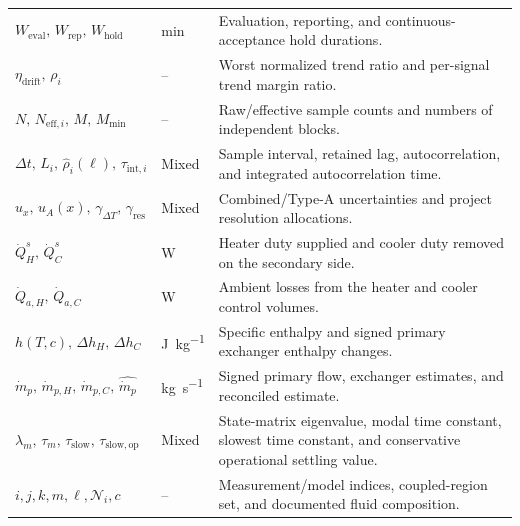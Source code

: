 \documentclass[11pt]{article}
\newcommand{\QHs}{\dot Q_{H}^{s}}
\newcommand{\QCs}{\dot Q_{C}^{s}}
\newcommand{\mdotp}{\dot m_{p}}
\newcommand{\mdotpH}{\dot m_{p,H}}
\newcommand{\mdotpC}{\dot m_{p,C}}
\begin{document}
\begin{longtable}{@{}>{\raggedright\arraybackslash}p{1.78in}>{\raggedright\arraybackslash}p{1.08in}>{\raggedright\arraybackslash}p{3.62in}@{}}
$W_{\mathrm{eval}},\,W_{\mathrm{rep}},\,W_{\mathrm{hold}}$ & \si{\minute} & Evaluation, reporting, and continuous-acceptance hold durations. \\
$\eta_{\mathrm{drift}},\,\rho_i$ & -- & Worst normalized trend ratio and per-signal trend margin ratio. \\
$N,\,N_{\mathrm{eff},i},\,M,\,M_{\min}$ & -- & Raw/effective sample counts and numbers of independent blocks. \\
$\Delta t,\,L_i,\,\widehat\rho_i(\ell),\,\tau_{\mathrm{int},i}$ & Mixed & Sample interval, retained lag, autocorrelation, and integrated autocorrelation time. \\
$u_x,\,u_A(x),\,\gamma_{\Delta T},\,\gamma_{\mathrm{res}}$ & Mixed & Combined/Type-A uncertainties and project resolution allocations. \\
$\QHs,\,\QCs$ & \si{\watt} & Heater duty supplied and cooler duty removed on the secondary side. \\
$\dot Q_{a,H},\,\dot Q_{a,C}$ & \si{\watt} & Ambient losses from the heater and cooler control volumes. \\
$h(T,c),\,\Delta h_H,\,\Delta h_C$ & \si{\joule\per\kilogram} & Specific enthalpy and signed primary exchanger enthalpy changes. \\
$\mdotp,\,\mdotpH,\,\mdotpC,\,\hat{\mdotp}$ & \si{\kilogram\per\second} & Signed primary flow, exchanger estimates, and reconciled estimate. \\
$\lambda_m,\,\tau_m,\,\tau_{\mathrm{slow}},\,\tau_{\mathrm{slow,op}}$ & Mixed & State-matrix eigenvalue, modal time constant, slowest time constant, and conservative operational settling value. \\
$i,j,k,m,\ell,\mathcal N_i,c$ & -- & Measurement/model indices, coupled-region set, and documented fluid composition. \\
\end{longtable}
\endgroup
\end{document}
